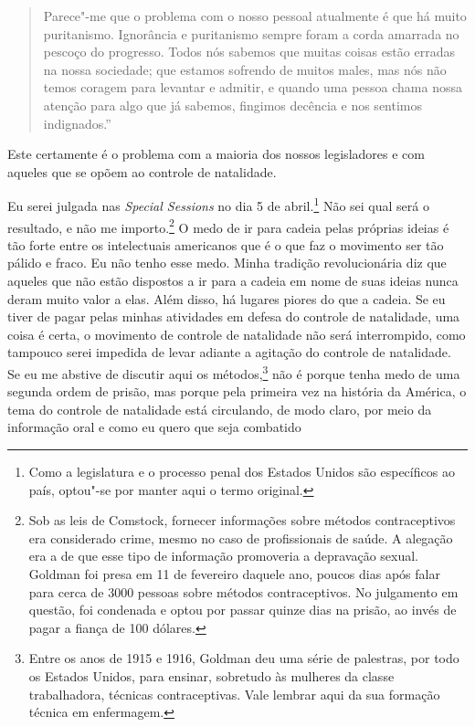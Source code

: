 \begin{quote}
Parece"-me que o problema com o nosso
pessoal atualmente é que há muito puritanismo. Ignorância e puritanismo
sempre foram a corda amarrada no pescoço do progresso. Todos nós sabemos
que muitas coisas estão erradas na nossa sociedade; que estamos sofrendo
de muitos males, mas nós não temos coragem para levantar e admitir, e
quando uma pessoa chama nossa atenção para algo que já sabemos, fingimos
decência e nos sentimos indignados.'' 
\end{quote}

Este certamente é o problema com a
maioria dos nossos legisladores e com aqueles que se opõem ao controle
de natalidade.

Eu serei julgada nas \textit{Special Sessions} no dia 5 de
abril.\footnote{Como a legislatura e o processo penal dos Estados Unidos
  são específicos ao país, optou"-se por manter aqui o termo original.}
Não sei qual será o resultado, e não me importo.\footnote{Sob as leis de
  Comstock, fornecer informações sobre métodos contraceptivos era
  considerado crime, mesmo no caso de profissionais de saúde. A alegação
  era a de que esse tipo de informação promoveria a depravação sexual.
  Goldman foi presa em 11 de fevereiro daquele ano, poucos dias após
  falar para cerca de 3000 pessoas sobre métodos contraceptivos. No
  julgamento em questão, foi condenada e optou por passar quinze dias na
  prisão, ao invés de pagar a fiança de 100 dólares.} O medo de ir para\label{ref5}
cadeia pelas próprias ideias é tão forte entre os intelectuais
americanos que é o que faz o movimento ser tão pálido e fraco. Eu não
tenho esse medo. Minha tradição revolucionária diz que aqueles que não
estão dispostos a ir para a cadeia em nome de suas ideias nunca deram
muito valor a elas. Além disso, há lugares piores do que a cadeia. Se eu
tiver de pagar pelas minhas atividades em defesa do controle de
natalidade, uma coisa é certa, o movimento de controle de natalidade não
será interrompido, como tampouco serei impedida de levar adiante a
agitação do controle de natalidade. Se eu me abstive de discutir aqui os
métodos,\footnote{Entre os anos de 1915 e 1916, Goldman deu uma série de
  palestras, por todo os Estados Unidos, para ensinar, sobretudo às
  mulheres da classe trabalhadora, técnicas contraceptivas. Vale lembrar
  aqui da sua formação técnica em enfermagem.} não é porque tenha medo
de uma segunda ordem de prisão, mas porque pela primeira vez na história
da América, o tema do controle de natalidade está circulando, de modo
claro, por meio da informação oral e como eu quero que seja combatido
